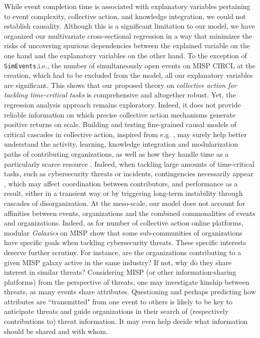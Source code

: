 \documentclass[unnumsec,webpdf,contemporary,large]{oup-authoring-template}%
\theoremstyle{thmstyleone}%
\theoremstyle{thmstyletwo}%
\theoremstyle{thmstylethree}%
\begin{document}
While event completion time is associated with explanatory variables pertaining to event complexity, collective action, and knowledge integration, we could not establish causality. Although this is a significant limitation to our model, we have organized our multivariate cross-sectional regression in a way that minimizes the risks of uncovering spurious dependencies between the explained variable on the one hand and the explanatory variables on the other hand. To the exception of \texttt{SimEvents},i.e., the number of simultaneously open events on MISP CIRCL at the creation, which had to be excluded from the model, all our explanatory variables are significant. This shows that our proposed theory on {\it collective action for tackling time-critical tasks} is comprehensive and altogether robust. Yet, the regression analysis approach remains exploratory. Indeed, it does not provide reliable information on which precise collective action mechanisms generate positive returns on scale. Building and testing fine-grained causal models of critical cascades in collective action, inspired from e.g. \cite{sornette2014much,maillart_aristotle_2019,muric_collaboration_2019}, may surely help better understand the activity, learning, knowledge integration and modularization paths of contributing organizations, as well as how they handle time as a particularly scarce resource \cite{maillart_quantification_2011}. Indeed, when tackling large amounts of time-critical tasks, such as cybersecurity threats or incidents, contingencies necessarily appear \cite{kuypers_designing_2018}, which may affect coordination between contributors, and performance as a result, either in a transient way or by triggering long-term instability through cascades of disorganization. At the meso-scale, our model does not account for affinities between events, organizations and the combined commonalities of events and organizations. Indeed, as for number of collective action online platforms, modular {\it Galaxies} on MISP show that some sub-communities of organizations have specific goals when tackling cybersecurity threats. These specific interests deserve further scrutiny. For instance, are the organizations contributing to a given MISP galaxy active in the same industry? If not, why do they share interest in similar threats? Considering MISP (or other information-sharing platforms) from the perspective of threats, one may investigate kinship between threats, as many events share attributes. Questioning and perhaps predicting how attributes are ``transmitted" from one event to others is likely to be key to anticipate threats and guide organizations in their search of (respectively contributions to) threat information. It may even help decide what information should be shared and with whom.
\end{document}
